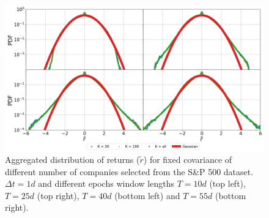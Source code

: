 \begin{figure}[htbp]
    \centering
    \includegraphics[width=0.8\columnwidth]
    {figures/06_window_comparison.png}
    \caption{Aggregated distribution of returns ($\tilde{r}$) for fixed
             covariance of different number of companies selected from the S\&P
             500 dataset. $\Delta t = 1d$ and different epochs window lengths
             $T=10d$ (top left), $T=25d$ (top right), $T=40d$ (bottom left) and
             $T=55d$ (bottom right).}
    \label{fig:window_comparison_long_norm}
\end{figure}